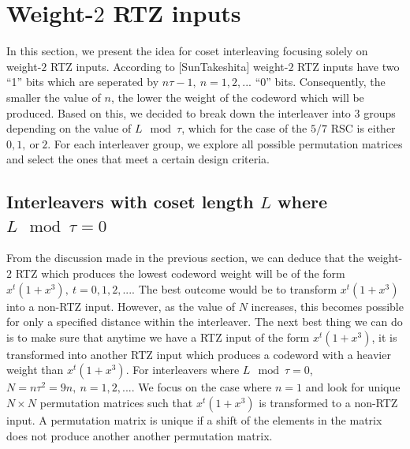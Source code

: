 \documentclass[11pt, oneside, dvipdfmx]{book}
\begin{document}
 \section{Weight-$2$ RTZ inputs}
 In this section, we present the idea for coset interleaving focusing solely on weight-$2$ RTZ inputs. According to [SunTakeshita] weight-$2$ RTZ inputs have two ``1'' bits which are seperated by $n\tau -1,~n=1,2,...$ ``0'' bits. Consequently, the smaller the value of $n$, the lower the weight of the codeword which will be produced. Based on this, we decided to break down the interleaver into 3 groups depending on the value of $L \mod \tau $, which for the case of the $5/7$ RSC is either $0,1,~\text{or}~2$. For each interleaver group, we explore all possible permutation matrices and select the ones that meet a certain design criteria. 
 
 \subsection{Interleavers with coset length $L$ where $L \mod \tau =0$}
 
 From the discussion made in the previous section, we can deduce that the weight-$2$ RTZ which produces the lowest codeword weight will be of the form $x^t(1+x^3),~t=0,1,2,...$. The best outcome would be to transform $x^t(1+x^3)$ into a non-RTZ input. However, as the value of $N$ increases, this becomes possible for only a specified distance within the interleaver. The next best thing we can do is to make sure that anytime we have a RTZ input of the form $x^t(1+x^3)$, it is transformed into another RTZ input which produces a codeword with a heavier weight than $x^t(1+x^3)$.  For interleavers where $L \mod \tau =0$, $N =n\tau^2 = 9n,~n=1,2,...$. We focus on the case where $n=1$ and look for unique $N \times N$ permutation matrices such that $x^t(1+x^3)$ is transformed to a non-RTZ input. A permutation matrix is unique if a shift of the elements in the matrix does not produce another another permutation matrix.
 
 
 
 
 
\end{document}
